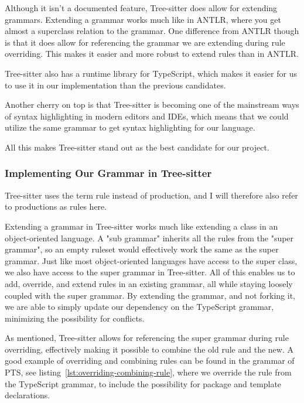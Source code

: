 Although it isn't a documented feature, Tree-sitter does allow for extending grammars.
Extending a grammar works much like in ANTLR, where you get almost a superclass relation to the grammar.
One difference from ANTLR though is that it does allow for referencing the grammar we are extending during rule overriding.
This makes it easier and more robust to extend rules than in ANTLR.

Tree-sitter also has a runtime library for TypeScript, which makes it easier for us to use it in our implementation than the previous candidates.

Another cherry on top is that Tree-sitter is becoming one of the mainstream ways of syntax highlighting in modern editors and IDEs, which means that we could utilize the same grammar to get syntax highlighting for our language.

All this makes Tree-sitter stand out as the best candidate for our project.

\subsubsection{Implementing Our Grammar in Tree-sitter}

Tree-sitter uses the term rule instead of production, and I will therefore also refer to productions as rules here.

Extending a grammar in Tree-sitter works much like extending a class in an object-oriented language.
A "sub grammar" inherits all the rules from the "super grammar", so an empty ruleset would effectively work the same as the super grammar.
Just like most object-oriented languages have access to the super class, we also have access to the super grammar in Tree-sitter.
All of this enables us to add, override, and extend rules in an existing grammar, all while staying loosely coupled with the super grammar.
By extending the grammar, and not forking it, we are able to simply update our dependency on the TypeScript grammar, minimizing the possibility for conflicts.

As mentioned, Tree-sitter allows for referencing the super grammar during rule overriding, effectively making it possible to combine the old rule and the new.
A good example of overriding and combining rules can be found in the grammar of PTS, see listing~\vref{lst:overriding-combining-rule}, where we override the  rule from the TypeScript grammar, to include the possibility for package and template declarations.



